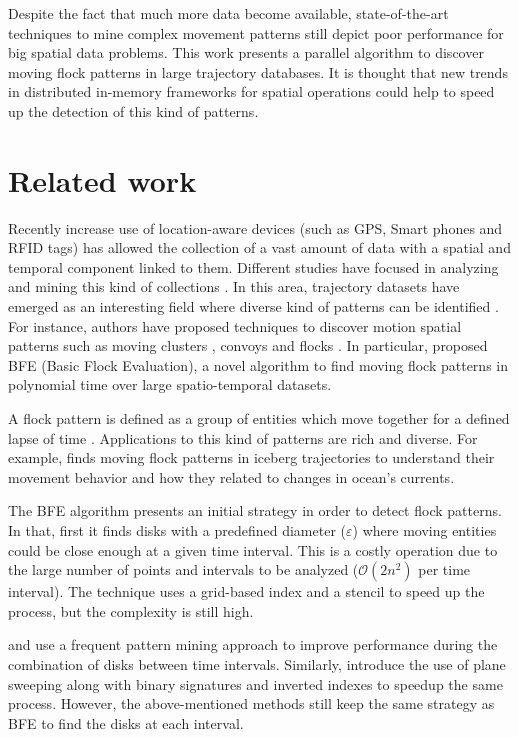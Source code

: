 \documentclass[journal,onecolumn]{IEEEtran}
\begin{document}
Despite the fact that much more data become available, state-of-the-art techniques to mine complex movement patterns still depict poor performance for big spatial data problems.  This work presents a parallel algorithm to discover moving flock patterns in large trajectory databases.  It is thought that new trends in distributed in-memory frameworks for spatial operations could help to speed up the detection of this kind of patterns.

\section{Related work}
Recently increase use of location-aware devices (such as GPS, Smart phones and RFID tags) has allowed the collection of a vast amount of data with a spatial and temporal component linked to them.  Different studies have focused in analyzing and mining this kind of collections \cite{leung_knowledge_2010, miller_geographic_2001}.  In this area, trajectory datasets have emerged as an interesting field where diverse kind of patterns can be identified \cite{zheng_computing_2011, vieira_spatio-temporal_2013}.  For instance, authors have proposed techniques to discover motion spatial patterns such as moving clusters \cite{kalnis_discovering_2005}, convoys \cite{jeung_discovery_2008} and flocks \cite{benkert_reporting_2008, gudmundsson_computing_2006}.  In particular, \cite{vieira_2009} proposed BFE (Basic Flock Evaluation), a novel algorithm to find moving flock patterns in polynomial time over large spatio-temporal datasets. 

A flock pattern is defined as a group of entities which move together for a defined lapse of time \cite{benkert_reporting_2008}.  Applications to this kind of patterns are rich and diverse.  For example, \cite{calderon_romero_mining_2011} finds moving flock patterns in iceberg trajectories to understand their movement behavior and how they related to changes in ocean's currents. 

The BFE algorithm presents an initial strategy in order to detect flock patterns.  In that, first it finds disks with a predefined diameter ($\varepsilon$) where moving entities could be close enough at a given time interval.  This is a costly operation due to the large number of points and intervals to be analyzed ($\mathcal{O}(2n^2)$ per time interval).  The technique uses a grid-based index and a stencil to speed up the process, but the complexity is still high.

\cite{calderon_romero_mining_2011} and \cite{turdukulov_visual_2014} use a frequent pattern mining approach to improve performance during the combination of disks between time intervals.  Similarly, \cite{tanaka_improved_2016} introduce the use of plane sweeping along with binary signatures and inverted indexes to speedup the same process.  However, the above-mentioned methods still keep the same strategy as BFE to find the disks at each interval.  
\end{document}
